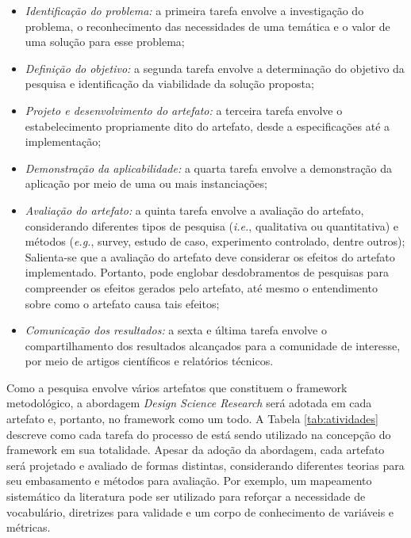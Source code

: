  \begin{itemize}
    \item \textit{Identificação do problema:} a primeira tarefa envolve a investigação do problema, o reconhecimento das necessidades de uma temática e o valor de uma solução para esse problema;
    \item \textit{Definição do objetivo:} a segunda tarefa envolve a determinação do objetivo da pesquisa e identificação da viabilidade da solução proposta;
    \item \textit{Projeto e desenvolvimento do artefato:} a terceira tarefa envolve o estabelecimento propriamente dito do artefato, desde a especificações até a implementação;
    \item \textit{Demonstração da aplicabilidade:} a quarta tarefa envolve a demonstração da aplicação por meio de uma ou mais instanciações;
    \item \textit{Avaliação do artefato:} a quinta tarefa envolve a avaliação do artefato, considerando diferentes tipos de pesquisa (\textit{i.e.}, qualitativa ou quantitativa) e métodos (\textit{e.g.}, survey, estudo de caso, experimento controlado, dentre outros);  Salienta-se que a avaliação do artefato deve considerar os efeitos do artefato implementado. Portanto, pode englobar desdobramentos de pesquisas para compreender os efeitos gerados pelo artefato, até mesmo o entendimento sobre como o artefato causa tais efeitos;
    \item \textit{Comunicação dos resultados:} a sexta e última tarefa envolve o compartilhamento dos resultados alcançados para a comunidade de interesse, por meio de artigos científicos e relatórios técnicos.

 \end{itemize}
 
Como a pesquisa envolve vários artefatos que constituem o framework metodológico, a abordagem \textit{Design Science Research} será adotada em cada artefato e, portanto, no framework como um todo. A Tabela \ref{tab:atividades} descreve como cada tarefa do processo de  está sendo utilizado na concepção do framework em sua totalidade. Apesar da adoção da abordagem, cada artefato será projetado e avaliado de formas distintas, considerando diferentes teorias para seu embasamento e métodos para avaliação. Por exemplo, um mapeamento sistemático da literatura pode ser utilizado para reforçar a necessidade de vocabulário, diretrizes para validade e um corpo de conhecimento de variáveis e métricas. 


